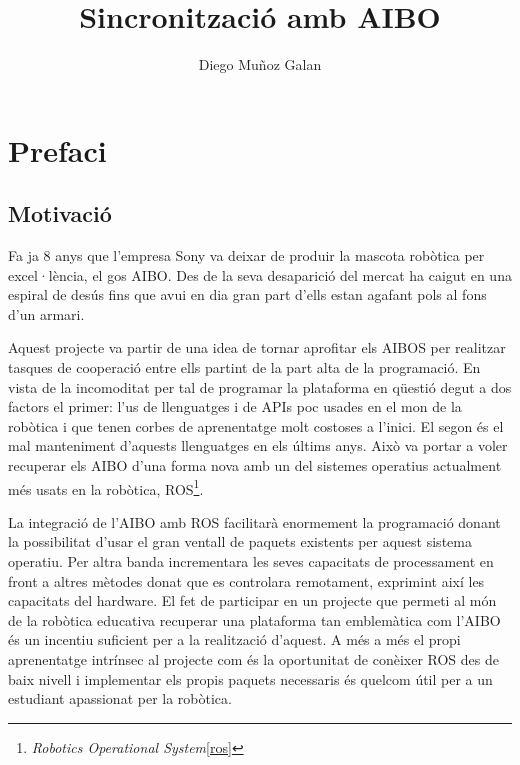 \documentclass[12pt,a4paper,final,twoside]{article}
\title{Sincronització amb AIBO}
\author{Diego Muñoz Galan}
\begin{document}
\maketitle
\thispagestyle{empty}

\newpage
\paragraph{}
\thispagestyle{empty}
\cleardoublepage

\setcounter{page}{1}

\begin{abstract}

\end{abstract}

\newpage
\cleardoublepage

\tableofcontents
\newpage
\listoffigures
\newpage
\listoftables
\newpage


\section{Prefaci}
\subsection{Motivació}
Fa ja 8 anys que l'empresa Sony va deixar de produir la mascota robòtica per excel·lència, el gos AIBO. Des de la seva desaparició del mercat ha caigut en una espiral de desús fins que avui en dia gran part d'ells estan agafant pols al fons d'un armari.

Aquest projecte va partir de una idea de tornar aprofitar els AIBOS per realitzar tasques de cooperació entre ells partint de la part alta de la programació. En vista de la incomoditat per tal de programar la plataforma en qüestió degut a dos factors el primer: l'us de llenguatges i de APIs poc usades en el mon de la robòtica i que tenen corbes de aprenentatge molt costoses a l'inici. El segon és el mal manteniment d'aquests llenguatges en els últims anys.
Això va portar a voler recuperar els AIBO d'una forma nova amb un del sistemes operatius actualment més usats en la robòtica, ROS\footnote{\textit{Robotics Operational System}\ref{ros}}. 

La integració de l'AIBO amb ROS facilitarà enormement la programació donant la possibilitat d'usar el gran ventall de paquets existents per aquest sistema operatiu. Per altra banda incrementara les seves capacitats de processament en front a altres mètodes donat que es controlara remotament, exprimint així les capacitats del hardware.
El fet de participar en un projecte que permeti al món de la robòtica educativa recuperar una plataforma tan emblemàtica com l'AIBO és un incentiu suficient per a la realització d'aquest. A més a més el propi aprenentatge intrínsec al projecte com és la oportunitat de conèixer ROS des de baix nivell i implementar els propis paquets necessaris és quelcom útil per a un estudiant apassionat per la robòtica. 
\end{document}
